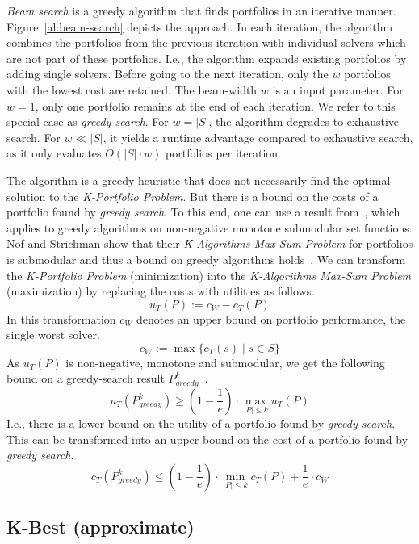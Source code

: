 \documentclass[conference]{IEEEtran}
\begin{document}
\emph{Beam search} is a greedy algorithm that finds portfolios in an iterative manner.
Figure~\ref{al:beam-search} depicts the approach. 
In each iteration, the algorithm combines the portfolios from the previous iteration with individual solvers which are not part of these portfolios. 
I.e., the algorithm expands existing portfolios by adding single solvers. 
Before going to the next iteration, only the $w$ portfolios with the lowest cost are retained.
The beam-width $w$ is an input parameter.
For $w=1$, only one portfolio remains at the end of each iteration.
We refer to this special case as \emph{greedy search}.
For $w = |S|$, the algorithm degrades to exhaustive search. 
For $w \ll |S|$, it yields a runtime advantage compared to exhaustive search, as it only evaluates $O(|S| \cdot w)$ portfolios per iteration. 

The algorithm is a greedy heuristic that does not necessarily find the optimal solution to the \emph{K-Portfolio Problem}. 
But there is a bound on the costs of a portfolio found by \emph{greedy search}. 
To this end, one can use a result from~\cite{nemhauser1978analysis}, which applies to greedy algorithms on non-negative monotone submodular set functions.
Nof and Strichman show that their \emph{K-Algorithms Max-Sum Problem} for portfolios is submodular and thus a bound on greedy algorithms holds~\cite{nof2020real}. 
We can transform the \emph{K-Portfolio Problem} (minimization) into the \emph{K-Algorithms Max-Sum Problem} (maximization) by replacing the costs with utilities as follows.%
$$
u_{T}(P) := c_W - c_{T}(P)
$$
In this transformation $c_W$ denotes an upper bound on portfolio performance, the single worst solver.%
$$
c_W := \max\{c_T(s) \mid s \in S\}
$$
As $u_{T}(P)$ is non-negative, monotone and submodular, we get the following bound on a greedy-search result $P_{greedy}^k$~\cite{nemhauser1978analysis, krause2014submodular}.%
$$
	u_{T}(P_{greedy}^k) \geq (1 - \frac{1}{e}) \cdot \max_{|P| \leq k}{u_{T}(P)}
$$
I.e., there is a lower bound on the utility of a portfolio found by \emph{greedy search}.
This can be transformed into an upper bound on the cost of a portfolio found by \emph{greedy search}.%
\begin{equation}
	c_{T}(P_{greedy}^k) \leq (1 - \frac{1}{e}) \cdot \min_{|P| \leq k}{c_{T}(P)} + \frac{1}{e} \cdot c_W
	\label{eq:upper-bound}
\end{equation}

\subsection{K-Best (approximate)}
\end{document}
